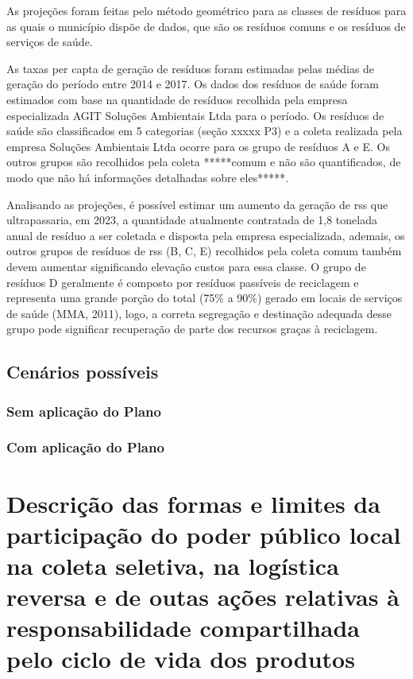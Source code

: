 As projeções foram feitas pelo método geométrico para as classes de resíduos para as quais o município dispõe de dados, que são os resíduos comuns e os resíduos de serviços de saúde. 

%

As taxas per capta de geração de resíduos foram estimadas pelas médias de geração do período entre 2014 e 2017. Os dados dos resíduos de saúde foram estimados com base na quantidade de resíduos recolhida pela empresa especializada AGIT Soluções Ambientais Ltda para o período. Os resíduos de saúde são classificados em 5 categorias (seção xxxxx P3) e a coleta realizada pela empresa Soluções Ambientais Ltda ocorre para os grupo de resíduos A e E. Os outros grupos são recolhidos pela coleta *****comum e não são quantificados, de modo que não há informações detalhadas sobre eles*****.

Analisando as projeções, é possível estimar um aumento da geração de \gls{rss} que ultrapassaria, em 2023, a quantidade atualmente contratada de 1,8 tonelada anual de resíduo a ser coletada e disposta pela empresa especializada, ademais, os outros grupos de resíduos de \gls{rss} (B, C, E) recolhidos pela coleta comum também devem aumentar significando elevação custos para essa classe. O grupo de resíduos D geralmente é composto por resíduos passíveis de reciclagem e representa uma grande porção do total (75\% a 90\%) gerado em locais de serviços de saúde (MMA, 2011), logo, a correta segregação e destinação adequada desse grupo pode significar recuperação de parte dos recursos graças à reciclagem.   

\subsection{Cenários possíveis}

\subsubsection{Sem aplicação do Plano}

\subsubsection{Com aplicação do Plano}	


\newpage
\FloatBarrier
\section{Descrição das formas e limites da participação do poder público local na coleta seletiva, na logística reversa e de outas ações relativas à responsabilidade compartilhada pelo ciclo de vida dos produtos}
\label{sec:lim_poder_pub}


